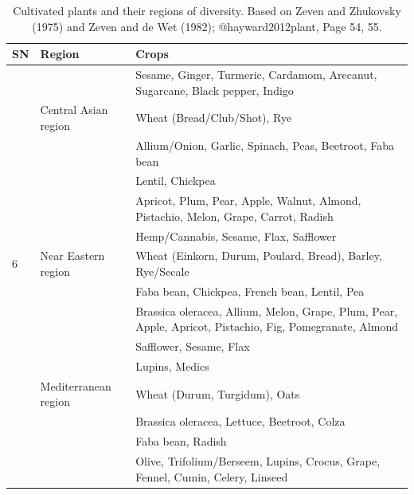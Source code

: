 \documentclass[ignorenonframetext,aspectratio=169]{beamer}
\begin{document}
\begin{frame}{}
\protect\hypertarget{section-12}{}

\begin{table}[t]

\caption{\label{tab:diversity-region2}Cultivated plants and their regions of diversity. Based on Zeven and Zhukovsky (1975) and Zeven and de Wet (1982); @hayward2012plant, Page 54, 55.}
\centering
\fontsize{6}{8}\selectfont
\begin{tabular}{>{\raggedright\arraybackslash}p{3em}>{\raggedright\arraybackslash}p{14em}>{\raggedright\arraybackslash}p{32em}}
\toprule
SN & Region & Crops\\
\midrule
\rowcolor{gray!6}   &  & Sesame, Ginger, Turmeric, Cardamom, Arecanut, Sugarcane, Black pepper, Indigo\\
5 & Central Asian region & Wheat (Bread/Club/Shot), Rye\\
\rowcolor{gray!6}   &  & Allium/Onion, Garlic, Spinach, Peas, Beetroot, Faba bean\\
 &  & Lentil, Chickpea\\
\rowcolor{gray!6}   &  & Apricot, Plum, Pear, Apple, Walnut, Almond, Pistachio, Melon, Grape, Carrot, Radish\\
\addlinespace
 &  & Hemp/Cannabis, Sesame, Flax, Safflower\\
\rowcolor{gray!6}  6 & Near Eastern region & Wheat (Einkorn, Durum, Poulard, Bread), Barley, Rye/Secale\\
 &  & Faba bean, Chickpea, French bean, Lentil, Pea\\
\rowcolor{gray!6}   &  & Brassica oleracea, Allium, Melon, Grape, Plum, Pear, Apple, Apricot, Pistachio, Fig, Pomegranate, Almond\\
 &  & Safflower, Sesame, Flax\\
\addlinespace
\rowcolor{gray!6}   &  & Lupins, Medics\\
7 & Mediterranean region & Wheat (Durum, Turgidum), Oats\\
\rowcolor{gray!6}   &  & Brassica oleracea, Lettuce, Beetroot, Colza\\
 &  & Faba bean, Radish\\
\rowcolor{gray!6}   &  & Olive, Trifolium/Berseem, Lupins, Crocus, Grape, Fennel, Cumin, Celery, Linseed\\
\bottomrule
\end{tabular}
\end{table}

\end{frame}
\end{document}
